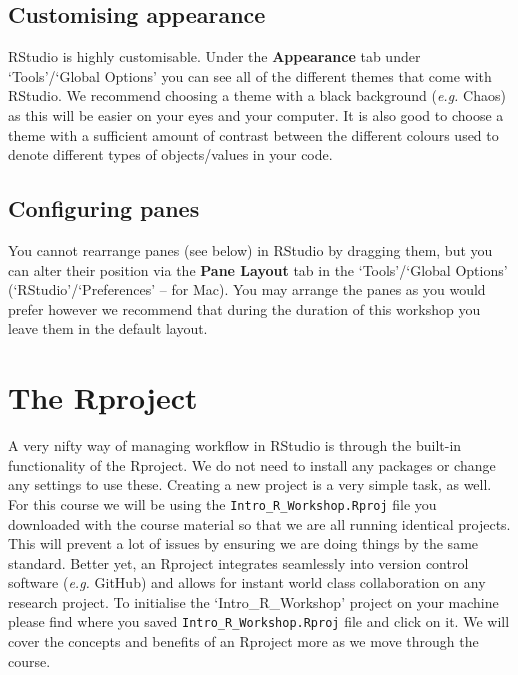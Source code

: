 \documentclass[
]{book}
\begin{document}
\hypertarget{customising-appearance}{%
\subsection{Customising appearance}\label{customising-appearance}}

RStudio is highly customisable. Under the \textbf{Appearance} tab under `Tools'/`Global Options' you can see all of the different themes that come with RStudio. We recommend choosing a theme with a black background (\emph{e.g.} Chaos) as this will be easier on your eyes and your computer. It is also good to choose a theme with a sufficient amount of contrast between the different colours used to denote different types of objects/values in your code.

\hypertarget{configuring-panes}{%
\subsection{Configuring panes}\label{configuring-panes}}

You cannot rearrange panes (see below) in RStudio by dragging them, but you can alter their position via the \textbf{Pane Layout} tab in the `Tools'/`Global Options' (`RStudio'/`Preferences' -- for Mac). You may arrange the panes as you would prefer however we recommend that during the duration of this workshop you leave them in the default layout.

\hypertarget{the-rproject}{%
\section{The Rproject}\label{the-rproject}}

A very nifty way of managing workflow in RStudio is through the built-in functionality of the Rproject. We do not need to install any packages or change any settings to use these. Creating a new project is a very simple task, as well. For this course we will be using the \texttt{Intro\_R\_Workshop.Rproj} file you downloaded with the course material so that we are all running identical projects. This will prevent a lot of issues by ensuring we are doing things by the same standard. Better yet, an Rproject integrates seamlessly into version control software (\emph{e.g.} GitHub) and allows for instant world class collaboration on any research project. To initialise the `Intro\_R\_Workshop' project on your machine please find where you saved \texttt{Intro\_R\_Workshop.Rproj} file and click on it. We will cover the concepts and benefits of an Rproject more as we move through the course.
\end{document}
